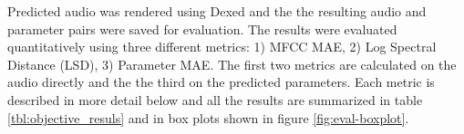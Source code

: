 %

Predicted audio was rendered using Dexed and the the resulting audio and parameter pairs were saved for evaluation. The results were evaluated quantitatively using three different metrics: 1) MFCC MAE,  2) Log Spectral Distance (LSD), 3) Parameter MAE. The first two metrics are calculated on the audio directly and the the third on the predicted parameters. Each metric is described in more detail below and all the results are summarized in table \ref{tbl:objective_resuls} and in box plots shown in figure \ref{fig:eval-boxplot}.

